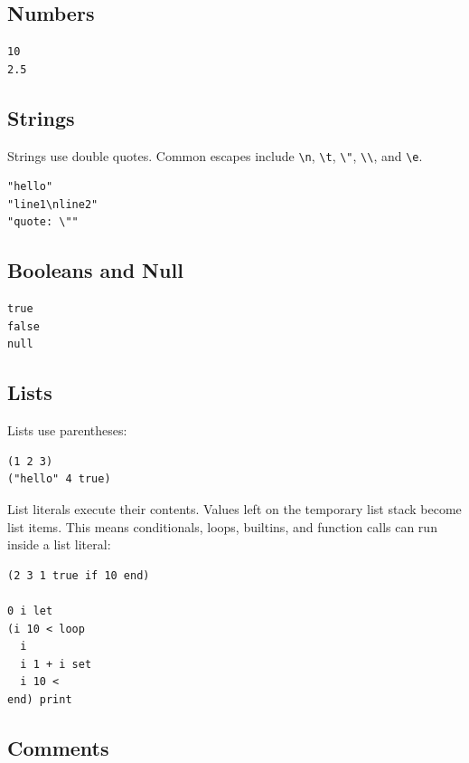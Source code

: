 \documentclass[11pt,a4paper]{article}
\newcommand{\code}[1]{\texttt{#1}}
\begin{document}
\subsection{Numbers}

\begin{lstlisting}[language=Raden]
10
2.5
\end{lstlisting}

\subsection{Strings}

Strings use double quotes. Common escapes include \code{\textbackslash n},
\code{\textbackslash t}, \code{\textbackslash "}, \code{\textbackslash\textbackslash},
and \code{\textbackslash e}.

\begin{lstlisting}[language=Raden]
"hello"
"line1\nline2"
"quote: \""
\end{lstlisting}

\subsection{Booleans and Null}

\begin{lstlisting}[language=Raden]
true
false
null
\end{lstlisting}

\subsection{Lists}

Lists use parentheses:

\begin{lstlisting}[language=Raden]
(1 2 3)
("hello" 4 true)
\end{lstlisting}

List literals execute their contents. Values left on the temporary list
stack become list items. This means conditionals, loops, builtins, and
function calls can run inside a list literal:

\begin{lstlisting}[language=Raden]
(2 3 1 true if 10 end)

0 i let
(i 10 < loop
  i
  i 1 + i set
  i 10 <
end) print
\end{lstlisting}

\subsection{Comments}
\end{document}
